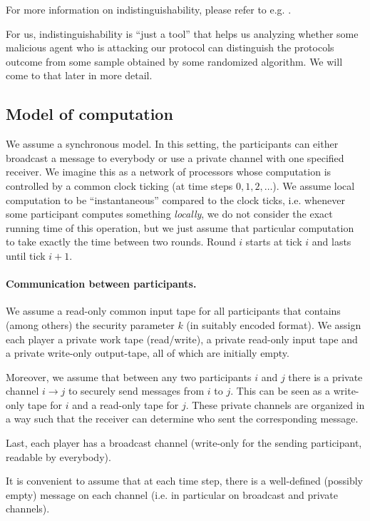 For more information on indistinguishability, please refer to e.g. \cite{goldreich_foundations_of_crypto_2}.

For us, indistinguishability is ``just a tool'' that helps us analyzing whether some malicious agent who is attacking our protocol can distinguish the protocols outcome from some sample obtained by some randomized algorithm. We will come to that later in more detail.

\subsection{Model of computation}
\label{sec:model-of-computation}

We assume a synchronous model. In this setting, the participants can either broadcast a message to everybody or use a private channel with one specified receiver. We imagine this as a network of processors whose computation is controlled by a common clock ticking (at time steps $0,1,2,\dots$). We assume local computation to be ``instantaneous'' compared to the clock ticks, i.e. whenever some participant computes something \emph{locally}, we do not consider the exact running time of this operation, but we just assume that particular computation to take exactly the time between two rounds. Round $i$ starts at tick $i$ and lasts until tick $i+1$.

\paragraph{Communication between participants.}

We assume a read-only common input tape for all participants that contains (among others) the security parameter $k$ (in suitably encoded format). We assign each player a private work tape (read/write), a private read-only input tape and a private write-only output-tape, all of which are initially empty. 

Moreover, we assume that between any two participants $i$ and $j$ there is a private channel $i\rightarrow j$ to securely send messages from $i$ to $j$. This can be seen as a write-only tape for $i$ and a read-only tape for $j$. These private channels are organized in a way such that the receiver can determine who sent the corresponding message.

Last, each player has a broadcast channel (write-only for the sending participant, readable by everybody).

It is convenient to assume that at each time step, there is a well-defined (possibly empty) message on each channel (i.e. in particular on broadcast and private channels).

